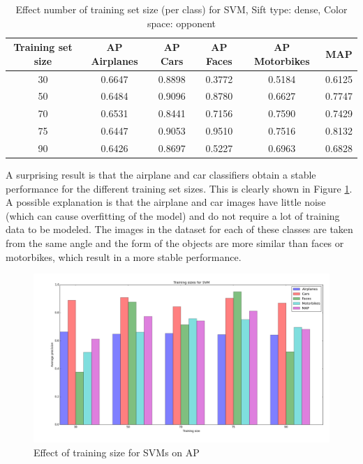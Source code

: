 \begin{table}[H]
\begin{center}
\begin{tabular}{|c|ccccc|}
\hline
\textbf{Training set size} & \textbf{AP Airplanes} & \textbf{AP Cars} & \textbf{AP Faces} & \textbf{AP Motorbikes} & \textbf{MAP}\\
\hline
30 & 0.6647 & 0.8898 & 0.3772 & 0.5184& 0.6125\\
50 & 0.6484 & 0.9096 & 0.8780 & 0.6627 & 0.7747\\
70 & 0.6531 & 0.8441 & 0.7156 & 0.7590 & 0.7429\\
75 & 0.6447 & 0.9053 & 0.9510 & 0.7516 & 0.8132\\
90 & 0.6426 & 0.8697 & 0.5227 & 0.6963 & 0.6828\\
\hline
\end{tabular}
\caption{Effect number of training set size (per class) for SVM, Sift type: dense, Color space: opponent}
\label{tab:svm}
\end{center}
\end{table}

A surprising result is that the airplane and car classifiers obtain a stable performance for the different training set sizes. This is clearly shown in Figure \ref{fig:svm}. A possible explanation is that the airplane and car images have little noise (which can cause overfitting of the model) and do not require a lot of training data to be modeled. The images in the dataset for each of these classes are taken from the same angle and the form of the objects are more similar than faces or motorbikes, which result in a more stable performance.

\begin{figure}[H]
\includegraphics[width=\textwidth]{../plots/training_size_SVM}
\caption{Effect of training size for SVMs on AP}
\label{fig:svm}
\end{figure}
